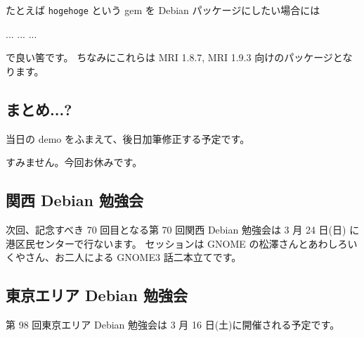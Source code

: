 \documentclass[mingoth,a4paper]{jsarticle}
\begin{document}
たとえば \texttt{hogehoge} という gem を Debian パッケージにしたい場合には
\begin{commandline}
...
...
...
\end{commandline}
で良い筈です。
ちなみにこれらは MRI 1.8.7, MRI 1.9.3 向けのパッケージとなります。

\subsection{まとめ...?}

当日の demo をふまえて、後日加筆修正する予定です。

\clearpage


すみません。今回お休みです。

\clearpage


\subsection{関西 Debian 勉強会}

次回、記念すべき 70 回目となる第 70 回関西 Debian 勉強会は 3 月 24 日(日)
に港区民センターで行ないます。
セッションは GNOME の松澤さんとあわしろいくやさん、お二人による GNOME3
話二本立てです。

\subsection{東京エリア Debian 勉強会}
第 98 回東京エリア Debian 勉強会は 3 月 16 日(土)に開催される予定です。

 \mbox{}\newpage

\printindex
\end{document}

